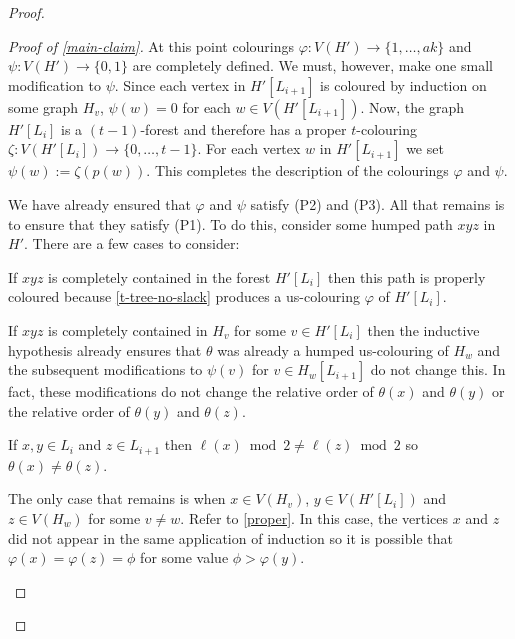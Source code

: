\documentclass[kpfonts]{patmorin}
\theoremstyle{named}
\begin{document}
\begin{proof}
\begin{proof}[Proof of \cref{main-claim}]
       At this point colourings $\varphi:V(H')\to\{1,\ldots,ak\}$ and $\psi:V(H')\to\{0,1\}$ are completely defined.  We must, however, make one small modification to $\psi$.  Since each vertex in $H'[L_{i+1}]$ is coloured by induction on some graph $H_v$, $\psi(w)=0$ for each $w\in V(H'[L_{i+1}])$.  Now, the graph $H'[L_i]$ is a $(t-1)$-forest and therefore has a proper $t$-colouring $\zeta:V(H'[L_i])\to\{0,\ldots,t-1\}$.  For each vertex $w$ in $H'[L_{i+1}]$ we set $\psi(w):=\zeta(p(w))$.  This completes the description of the colourings $\varphi$ and $\psi$.

       We have already ensured that $\varphi$ and $\psi$ satisfy (P2) and (P3). All that remains is to ensure that they satisfy (P1).  To do this, consider some humped path $xyz$ in $H'$.  There are a few cases to consider:
       \begin{compactenum}
          \item If $xyz$ is completely contained in the forest $H'[L_i]$ then this path is properly coloured because \cref{t-tree-no-slack} produces a us-colouring $\varphi$ of $H'[L_i]$.
          \item If $xyz$ is completely contained in $H_v$ for some $v\in H'[L_i]$ then the inductive hypothesis already ensures that $\theta$ was already a humped us-colouring of $H_w$ and the subsequent modifications to $\psi(v)$ for $v\in H_w[L_{i+1}]$ do not change this. In fact, these modifications do not change the relative order of $\theta(x)$ and $\theta(y)$ or the relative order of $\theta(y)$ and $\theta(z)$.
          \item If $x,y\in L_i$ and $z\in L_{i+1}$ then $\ell(x)\bmod 2\neq\ell(z)\bmod 2$ so $\theta(x)\neq\theta(z)$.
          \item The only case that remains is when $x\in V(H_{v})$, $y\in V(H'[L_i])$ and $z\in V(H_w)$ for some $v\neq w$. Refer to \cref{proper}.  In this case, the vertices $x$ and $z$ did not appear in the same application of induction so it is possible that $\varphi(x)=\varphi(z)=\phi$ for some value $\phi>\varphi(y)$.


\end{compactenum}
\end{proof}
\end{proof}
\end{document}

